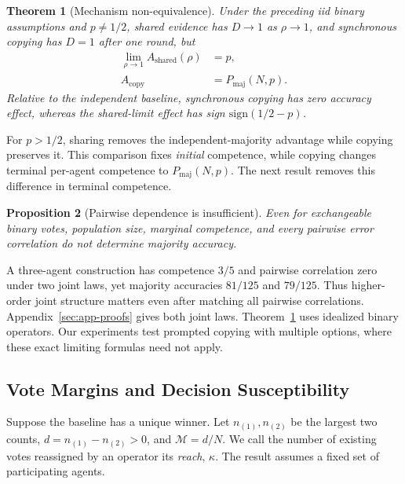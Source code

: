 \documentclass[11pt,a4paper]{article}
\newtheorem{theorem}{Theorem}
\newtheorem{proposition}[theorem]{Proposition}
\theoremstyle{definition}
\newcommand{\Dep}{D}
\newcommand{\Marg}{\mathcal{M}}
\begin{document}
\begin{theorem}[Mechanism non-equivalence]
\label{thm:nonequiv}
Under the preceding iid binary assumptions and $p\neq1/2$, shared evidence
has $\Dep\to1$ as $\rho\to1$, and synchronous copying has $\Dep=1$ after
one round, but
\begin{equation}
\begin{aligned}
\lim_{\rho\to1}A_{\mathrm{shared}}(\rho)&=p,\\
A_{\mathrm{copy}}&=P_{\mathrm{maj}}(N,p).
\end{aligned}
\label{eq:main-mechanism-limits}
\end{equation}
Relative to the independent baseline, synchronous copying has zero accuracy
effect, whereas the shared-limit effect has sign $\mathrm{sign}(1/2-p)$.
\end{theorem}

For $p>1/2$, sharing removes the independent-majority advantage while
copying preserves it. This comparison fixes \emph{initial} competence, while
copying changes terminal per-agent competence to $P_{\mathrm{maj}}(N,p)$.
The next result removes this difference in terminal competence.

\begin{proposition}[Pairwise dependence is insufficient]
\label{cor:insufficient}
Even for exchangeable binary votes, population size, marginal competence,
and every pairwise error correlation do not determine majority accuracy.
\end{proposition}

A three-agent construction has competence $3/5$ and pairwise correlation
zero under two joint laws, yet majority accuracies $81/125$ and $79/125$.
Thus higher-order joint structure matters even after matching all pairwise
correlations. Appendix~\ref{sec:app-proofs} gives both joint laws. Theorem~\ref{thm:nonequiv}
uses idealized binary operators. Our experiments test prompted copying with
multiple options, where these exact limiting formulas need not apply.

\subsection{Vote Margins and Decision Susceptibility}
\label{sec:main-susceptibility}

Suppose the baseline has a unique winner. Let $n_{(1)},n_{(2)}$ be the
largest two counts, $d=n_{(1)}-n_{(2)}>0$, and $\Marg=d/N$.
We call the number of existing votes reassigned by an operator its
\emph{reach}, $\kappa$. The result assumes a fixed set of participating agents.
\end{document}
